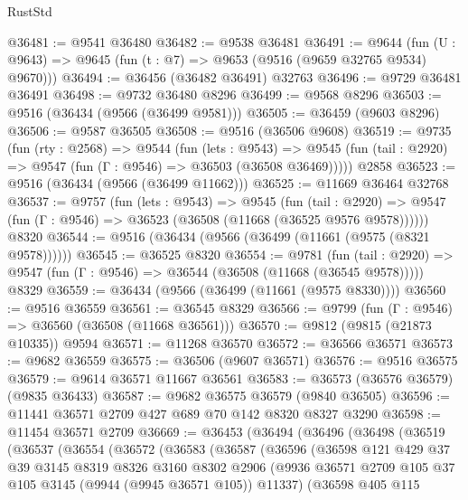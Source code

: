 \begin{lexlean}{RustStd}
\begin{coremodule}
@36481 := @9541 @36480
@36482 := @9538 @36481
@36491 := @9644
    (fun (U : @9643) => @9645 (fun (t : @7) => @9653 (@9516 (@9659 @32765 @9534) @9670)))
@36494 := @36456 (@36482 @36491) @32763
@36496 := @9729 @36481 @36491
@36498 := @9732 @36480 @8296
@36499 := @9568 @8296
@36503 := @9516 (@36434 (@9566 (@36499 @9581)))
@36505 := @36459 (@9603 @8296)
@36506 := @9587 @36505
@36508 := @9516 (@36506 @9608)
@36519 := @9735
    (fun (rty : @2568) =>
    @9544
      (fun (lets : @9543) =>
      @9545 (fun (tail : @2920) => @9547 (fun (Γ : @9546) => @36503 (@36508 @36469)))))
    @2858
@36523 := @9516 (@36434 (@9566 (@36499 @11662)))
@36525 := @11669 @36464 @32768
@36537 := @9757
    (fun (lets : @9543) =>
    @9545
      (fun (tail : @2920) =>
      @9547 (fun (Γ : @9546) => @36523 (@36508 (@11668 (@36525 @9576 @9578))))))
    @8320
@36544 := @9516 (@36434 (@9566 (@36499 (@11661 (@9575 (@8321 @9578))))))
@36545 := @36525 @8320
@36554 := @9781
    (fun (tail : @2920) => @9547 (fun (Γ : @9546) => @36544 (@36508 (@11668 (@36545 @9578)))))
    @8329
@36559 := @36434 (@9566 (@36499 (@11661 (@9575 @8330))))
@36560 := @9516 @36559
@36561 := @36545 @8329
@36566 := @9799 (fun (Γ : @9546) => @36560 (@36508 (@11668 @36561)))
@36570 := @9812 (@9815 (@21873 @10335)) @9594
@36571 := @11268 @36570
@36572 := @36566 @36571
@36573 := @9682 @36559
@36575 := @36506 (@9607 @36571)
@36576 := @9516 @36575
@36579 := @9614 @36571 @11667 @36561
@36583 := @36573 (@36576 @36579) (@9835 @36433)
@36587 := @9682 @36575 @36579 (@9840 @36505)
@36596 := @11441 @36571 @2709 @427 @689 @70 @142 @8320 @8327 @3290
@36598 := @11454 @36571 @2709
@36669 := @36453
    (@36494
      (@36496
        (@36498
          (@36519
            (@36537
              (@36554
                (@36572
                  (@36583
                    (@36587
                      (@36596
                        (@36598
                          @121
                          @429
                          @37
                          @39
                          @3145
                          @8319
                          @8326
                          @3160
                          @8302
                          @2906
                          (@9936
                            @36571
                            @2709
                            @105
                            @37
                            @105
                            @3145
                            (@9944 (@9945 @36571 @105))
                            @11337)
                          (@36598
                            @405
                            @115

\end{coremodule}
\end{lexlean}
